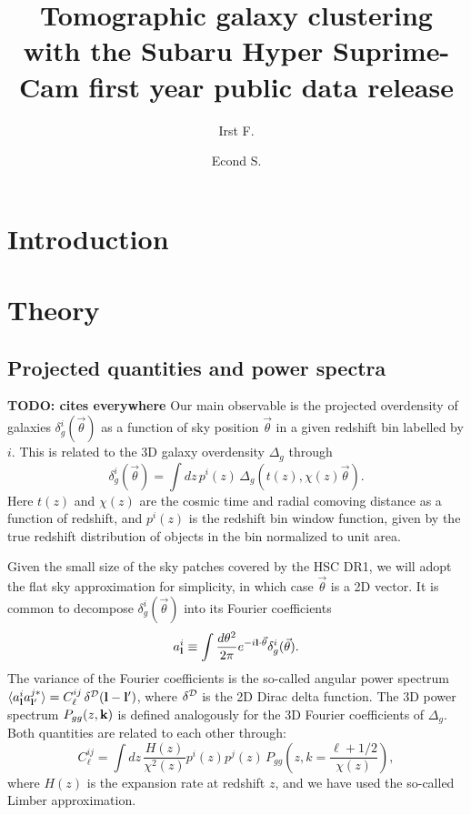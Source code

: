 \documentclass[a4paper,11pt]{article}
\title{Tomographic galaxy clustering with the Subaru Hyper Suprime-Cam first year public data release}
\author[a,1]{Irst F.}
\author[b]{Econd S.}
\affiliation[a]{Dept. of Paranormal Activity, Miskatonic University, Arkham, MA}
\affiliation[b]{Some other place}
\newcommand{\nv}{\vec{\theta}}
\newcommand{\todo}[1]{{\bf TODO: #1}}
\begin{document}
\maketitle
\flushbottom

\section{Introduction}\label{sec:intro}
\lipsum[1]

\section{Theory}\label{sec:theory}
  \subsection{Projected quantities and power spectra}\label{ssec:theory.cellpk}
    \todo{cites everywhere}
    Our main observable is the projected overdensity of galaxies $\delta^i_g(\nv)$ as a function of sky position $\nv$ in a given redshift bin labelled by $i$. This is related to the 3D galaxy overdensity $\Delta_g$ through
    \begin{equation}
      \delta^i_g(\nv)=\int dz\,p^i(z)\,\Delta_g\left(t(z),\chi(z)\nv\right).
    \end{equation}
    Here $t(z)$ and $\chi(z)$ are the cosmic time and radial comoving distance as a function of redshift, and $p^i(z)$ is the redshift bin window function, given by the true redshift distribution of objects in the bin normalized to unit area.
  
    Given the small size of the sky patches covered by the HSC DR1, we will adopt the flat sky approximation for simplicity, in which case $\nv$ is a 2D vector. It is common to decompose $\delta^i_g(\nv)$ into its Fourier coefficients
    \begin{equation}
      a^i_{\bf l}\equiv \int\frac{d\theta^2}{2\pi}e^{-i{\bf l}\cdot\nv}\delta^i_g(\nv).
    \end{equation}
    The variance of the Fourier coefficients is the so-called angular power spectrum $\langle a^i_{\bf l}a^{j*}_{{\bf l}'}\rangle = C^{ij}_\ell\,\delta^{\cal D}({\bf l}-{\bf l}')$, where $\delta^{\cal D}$ is the 2D Dirac delta function. The 3D power spectrum $P_{gg}(z,{\bf k})$ is defined analogously for the 3D Fourier coefficients of $\Delta_g$. Both quantities are related to each other through:
    \begin{equation}\label{eq:cell_gg_limber}
      C^{ij}_\ell = \int dz\,\frac{H(z)}{\chi^2(z)} p^i(z)p^j(z)\,P_{gg}\left(z,k=\frac{\ell+1/2}{\chi(z)}\right),
    \end{equation}
    where $H(z)$ is the expansion rate at redshift $z$, and we have used the so-called Limber approximation.
  
\end{document}
